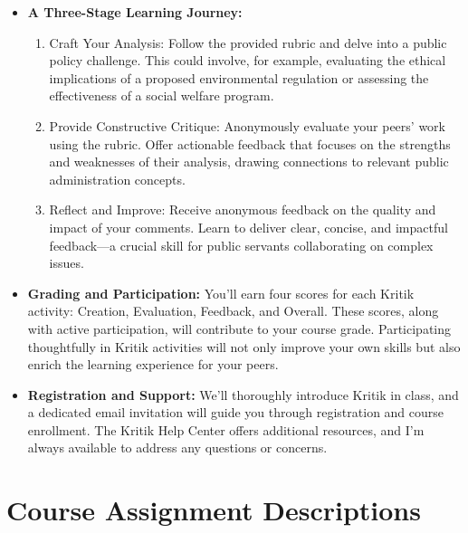 \documentclass[12pt, letterpaper]{article}
\begin{document}
\begin{itemize}

\item \textbf{A Three-Stage Learning Journey:}

\begin{enumerate}
    \item Craft Your Analysis: Follow the provided rubric and delve into a public policy challenge. This could involve, for example, evaluating the ethical implications of a proposed environmental regulation or assessing the effectiveness of a social welfare program.
    \item Provide Constructive Critique: Anonymously evaluate your peers' work using the rubric. Offer actionable feedback that focuses on the strengths and weaknesses of their analysis, drawing connections to relevant public administration concepts.
    \item Reflect and Improve: Receive anonymous feedback on the quality and impact of your comments. Learn to deliver clear, concise, and impactful feedback—a crucial skill for public servants collaborating on complex issues.
\end{enumerate}

\item \textbf{Grading and Participation:} You'll earn four scores for each Kritik activity: Creation, Evaluation, Feedback, and Overall. These scores, along with active participation, will contribute to your course grade. Participating thoughtfully in Kritik activities will not only improve your own skills but also enrich the learning experience for your peers.

\item \textbf{Registration and Support:} We'll thoroughly introduce Kritik in class, and a dedicated email invitation will guide you through registration and course enrollment. The Kritik Help Center offers additional resources, and I'm always available to address any questions or concerns.
\end{itemize}
\section{Course Assignment Descriptions}
\end{document}
